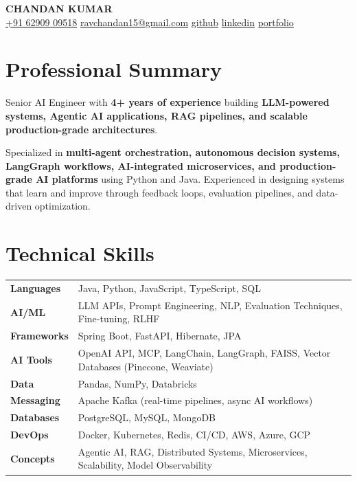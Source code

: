 \documentclass[10pt, letterpaper]{article}
\begin{document}
\begin{center}
{\LARGE\bfseries\color{primary} CHANDAN KUMAR}\\[4pt]

\small\color{subtle}
\href{tel:+916290909518}{+91 62909 09518} \quad
\href{mailto:ravchandan15@gmail.com}{ravchandan15@gmail.com} \quad
\href{https://github.com/RavSinghChandan}{github} \quad
\href{https://linkedin.com}{linkedin} \quad
\href{https://chandan-kumar-ai-engineer.vercel.app/}{portfolio}
\end{center}

\vspace{-2pt}

\section{Professional Summary}

\noindent Senior AI Engineer with \textbf{4+ years of experience} building \textbf{LLM-powered systems, Agentic AI applications, RAG pipelines, and scalable production-grade architectures}.

\vspace{3pt}

\noindent Specialized in \textbf{multi-agent orchestration, autonomous decision systems, LangGraph workflows, AI-integrated microservices, and production-grade AI platforms} using Python and Java. Experienced in designing systems that learn and improve through feedback loops, evaluation pipelines, and data-driven optimization.

\section{Technical Skills}

\begin{tabularx}{\textwidth}{@{} l X @{}}
\textbf{Languages} & Java, Python, JavaScript, TypeScript, SQL \\[2pt]
\textbf{AI/ML} & LLM APIs, Prompt Engineering, NLP, Evaluation Techniques, Fine-tuning, RLHF \\[2pt]
\textbf{Frameworks} & Spring Boot, FastAPI, Hibernate, JPA \\[2pt]
\textbf{AI Tools} & OpenAI API, MCP, LangChain, LangGraph, FAISS, Vector Databases (Pinecone, Weaviate) \\[2pt]
\textbf{Data} & Pandas, NumPy, Databricks \\[2pt]
\textbf{Messaging} & Apache Kafka (real-time pipelines, async AI workflows) \\[2pt]
\textbf{Databases} & PostgreSQL, MySQL, MongoDB \\[2pt]
\textbf{DevOps} & Docker, Kubernetes, Redis, CI/CD, AWS, Azure, GCP \\[2pt]
\textbf{Concepts} & Agentic AI, RAG, Distributed Systems, Microservices, Scalability, Model Observability \\
\end{tabularx}
\end{document}

